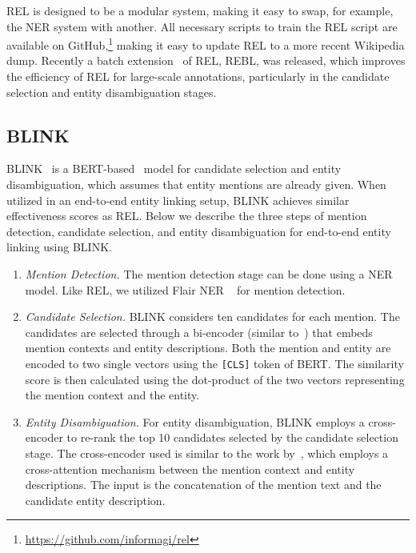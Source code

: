 REL is designed to be a modular system, making it easy to swap, for example, the NER system with another. All necessary scripts to train the REL script are available on GitHub,\footnote{\url{https://github.com/informagi/rel}} making it easy to update REL to a more recent Wikipedia dump. Recently a batch extension~\citep{rebl} of REL, REBL, was released, which improves the efficiency of REL for large-scale annotations, particularly in the candidate selection and entity disambiguation stages.  

\subsection{BLINK}
BLINK~\citep{blink} is a BERT-based~\citep{BERT} model for candidate selection and entity disambiguation, which assumes that entity mentions are already given. When utilized in an end-to-end entity linking setup, BLINK achieves similar effectiveness scores as REL. Below we describe the three steps of mention detection, candidate selection, and entity disambiguation for end-to-end entity linking using BLINK.

\begin{enumerate}
	\item \emph{Mention Detection.} The mention detection stage can be done using a NER model. Like REL, we utilized Flair NER ~\citep{flair} for mention detection.
	\item \emph{Candidate Selection.} BLINK considers ten candidates for each mention. The candidates are selected through a bi-encoder (similar to~\cite{poly-encoders}) that embeds mention contexts and entity descriptions. Both the mention and entity are encoded to two single vectors using the \texttt{[CLS]} token of BERT. The similarity score is then calculated using the dot-product of the two vectors representing the mention context and the entity.  
	\item \emph{Entity Disambiguation.} For entity disambiguation, BLINK employs a cross-encoder to re-rank the top 10 candidates selected by the candidate selection stage. The cross-encoder used is similar to the work by~\citet{poly-encoders}, which employs a cross-attention mechanism between the mention context and entity descriptions. The input is the concatenation of the mention text and the candidate entity description.  
\end{enumerate}

